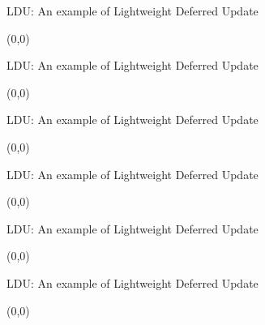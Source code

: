 \documentclass[english]{beamer} %
\begin{document}
\begin{frame}{LDU: An example of Lightweight Deferred Update}
\begin{textblock}{1}(0,0)
\end{textblock}
\end{frame}


\begin{frame}{LDU: An example of Lightweight Deferred Update}
\begin{textblock}{1}(0,0)
\end{textblock}
\end{frame}


\begin{frame}{LDU: An example of Lightweight Deferred Update}
\begin{textblock}{1}(0,0)
\end{textblock}
\end{frame}



\begin{frame}{LDU: An example of Lightweight Deferred Update}
\begin{textblock}{1}(0,0)
\end{textblock}
\end{frame}

\begin{frame}{LDU: An example of Lightweight Deferred Update}
\begin{textblock}{1}(0,0)
\end{textblock}
\end{frame}

\begin{frame}{LDU: An example of Lightweight Deferred Update}
\begin{textblock}{1}(0,0)
\end{textblock}
\end{frame}
\end{document}
